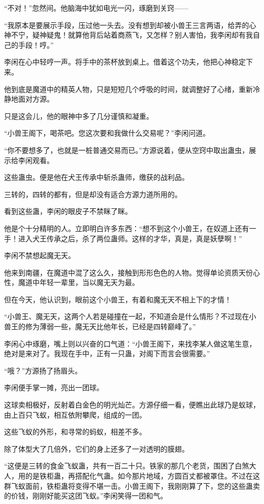 \begin{this_body}
“不对！”忽然间。他脑海中犹如电光一闪，琢磨到关窍——

“我原本是要展示手段，压过他一头去。没有想到却被小兽王三言两语，给弄的心神不宁，疑神疑鬼！就算他背后站着商燕飞，又怎样？别人害怕，我李闲却有我自己的手段！哼。”

李闲在心中轻哼一声。将手中的茶杯放到桌上。借着这个功夫，他把心神稳定下来。

他到底是魔道中的精英人物，只是短短几个呼吸的时间，就调整好了心绪，重新冷静地面对方源。

只是这会儿，他的眼神中多了几分谨慎和凝重。

“小兽王阁下，喝茶吧。您这次要和我做什么交易呢？”李闲问道。

“你不要想多了，也就是一桩普通交易而已。”方源说着，便从空窍中取出蛊虫，展示给李闲观看。

这些蛊虫。便是他在犬王传承中斩杀蛊师，缴获的战利品。

三转的，四转的都有，但是却没有适合方源力道所用的。

看到这些蛊，李闲的眼皮子不禁眯了眯。

他是个十分精明的人。立即明白许多东西：“想不到这个小兽王，在奴道上还有一手！进入犬王传承之后，杀了两位蛊师。这样的才华，真是，真是妖孽啊！”

李闲不禁想起魔无天。

他来到南疆，在魔道中混了这么久，接触到形形色色的人物。觉得单论资质天份心性，魔道中年轻一辈里，当以魔无天为最。

但在今天，他认识到，眼前这个小兽王，有着和魔无天不相上下的才情！

“小兽王、魔无天，这两个人若是碰撞在一起，不知道会是什么情形？不过现在小兽王的修为薄弱一些，魔无天比他年长，已经是四转巅峰了。”

李闲心中琢磨，嘴上则以兴奋的口气道：“小兽王阁下，来找李某人做这笔生意，绝对是来对了。我现在手中，正有一只蛊，对阁下而言会很需要。”

“哦？”方源扬了扬眉头。

李闲便手掌一摊，亮出一团球。

这球卖相极好，反射着白金色的明光灿芒。方源仔细一看，便瞧出此球乃是蚁球，由上百只飞蚁，相互依附攀爬，组成的一团。

这些飞蚁的外形，和寻常的蚂蚁，相差不多。

除了体型大了几倍外，它们的身上还多了一对透明的膜翅。

“这便是三转的食金飞蚁蛊，共有一百二十只。铁家的那几个老货，围困了白煞大人，用的是铁柜蛊，再搭配化气蛊。如今那片地域，方圆百丈都被罩住。不过在这群飞蚁面前，铁柜蛊将变得不堪一击。小兽王阁下，我刚刚算了下，您的这些蛊卖的价钱，刚刚好能买这团飞蚁。”李闲笑得一团和气。


\end{this_body}
